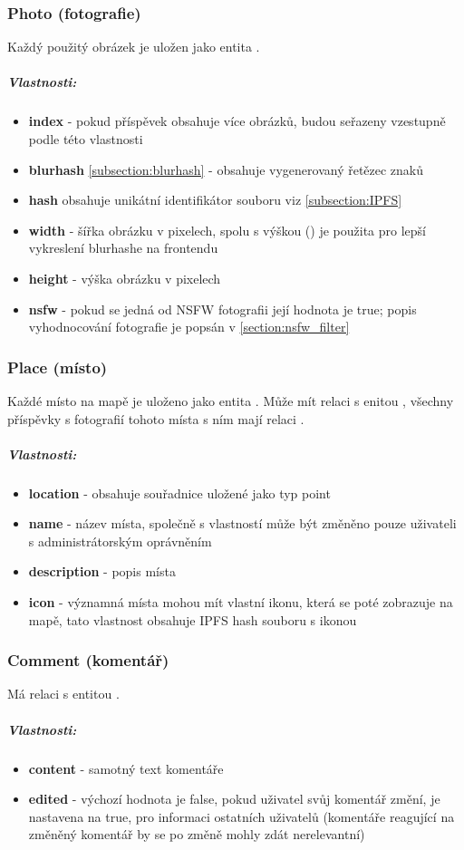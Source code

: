 \documentclass[12pt, a4paper,
 twoside,        %
 openright
]{report}
\newenvironment{propertiesItemize}{
\begin{itemize}{ 
  }}
  {\end{itemize}}
\begin{document}
\subsubsection{Photo (fotografie)} Každý použitý obrázek je uložen jako entita .
\subparagraph{Vlastnosti:}
\begin{propertiesItemize}
	\item \textbf{index} - pokud příspěvek obsahuje více obrázků, budou seřazeny vzestupně podle této vlastnosti
	\item \textbf{blurhash} \ref{subsection:blurhash} - obsahuje vygenerovaný řetězec znaků
	\item \textbf{hash} obsahuje unikátní identifikátor souboru viz \ref{subsection:IPFS}
	\item \textbf{width} - šířka obrázku v pixelech, spolu s výškou () je použita pro lepší vykreslení blurhashe na frontendu
	\item \textbf{height} - výška obrázku v pixelech
	\item \textbf{nsfw} - pokud se jedná od NSFW fotografii její hodnota je true; popis vyhodnocování fotografie je popsán v \ref{section:nsfw_filter}
\end{propertiesItemize}
\subsubsection{Place (místo)} Každé místo na mapě je uloženo jako entita . Může mít relaci  s enitou , všechny příspěvky s fotografií tohoto místa s ním mají relaci .
\subparagraph{Vlastnosti:}
\begin{propertiesItemize}
	\item \textbf{location} - obsahuje souřadnice uložené jako typ point \cite{Neo4jSparialFunctions}
	\item \textbf{name} - název místa, společně s vlastností  může být změněno pouze uživateli s administrátorským oprávněním
	\item \textbf{description} - popis místa
	\item \textbf{icon} - významná místa mohou mít vlastní ikonu, která se poté zobrazuje na mapě, tato vlastnost obsahuje IPFS hash souboru s ikonou
\end{propertiesItemize}
\subsubsection{Comment (komentář)} Má relaci  s entitou .
\subparagraph{Vlastnosti:}
\begin{propertiesItemize}
	\item \textbf{content} - samotný text komentáře
	\item \textbf{edited} - výchozí hodnota je false, pokud uživatel svůj komentář změní, je nastavena na true, pro informaci ostatních uživatelů (komentáře reagující na změněný komentář by se po změně mohly zdát nerelevantní)
\end{propertiesItemize}
\end{document}
